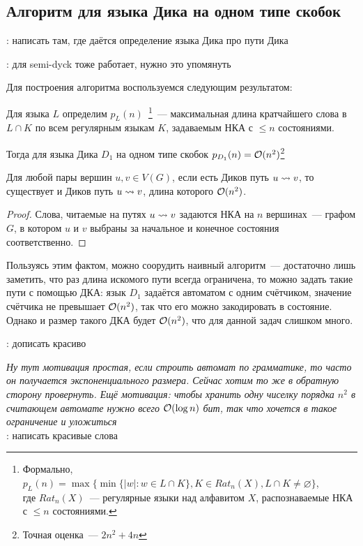\subsection{Алгоритм для языка Дика на одном типе скобок}

\TODO: написать там, где даётся определение языка Дика про пути Дика

\TODO: для semi-dyck тоже работает, нужно это упомянуть

Для построения алгоритма воспользуемся следующим результатом:

\begin{lemma}\cite{Deleage1986}

Для языка $L$ определим $p_L(n)$~\footnote{Формально, $p_L(n) = \max \{ \min \{|w| \colon w \in L \cap K \}, K \in Rat_n(X), L \cap K \ne \varnothing \}$,\\ где $Rat_n(X)$~--- регулярные языки над алфавитом $X$, распознаваемые НКА с $\le n$ состояниями.}~--- максимальная длина кратчайшего слова в $L \cap K$ по всем регулярным языкам $K$, задаваемым НКА с $\le n$ состояниями.

Тогда для языка Дика $D_1$ на одном типе скобок $p_{D_1}(n) = \mathcal{O}(n^2)$\footnote{Точная оценка~--- $2n^2 + 4n$}
\end{lemma}

\begin{corollary}
    Для любой пары вершин $u, v \in V(G)$, если есть Диков путь $u \rightsquigarrow v$, то существует и Диков путь $u \rightsquigarrow v$, длина которого $\mathcal{O}(n^2)$.
\end{corollary}
\begin{proof}
    Слова, читаемые на путях $u \rightsquigarrow v$ задаются НКА на $n$ вершинах~--- графом $G$, в котором $u$ и $v$ выбраны за начальное и конечное состояния соответственно.
\end{proof}

\begin{note}
Пользуясь этим фактом, можно соорудить наивный алгоритм~--- достаточно лишь заметить, что раз длина искомого пути всегда ограничена, то можно задать такие пути с помощью ДКА: язык $D_1$ задаётся автоматом с одним счётчиком, значение счётчика не превышает $\mathcal{O}(n^2)$, так что его можно закодировать в состояние. Однако и размер такого ДКА будет $\mathcal{O}(n^2)$, что для данной задач слишком много.
\end{note} 

\TODO: дописать красиво

\textit{Ну тут мотивация простая, если строить автомат по грамматике, то часто он получается экспоненциального размера. Сейчас хотим то же в обратную сторону провернуть. Ещё мотивация: чтобы хранить одну чиселку порядка $n^2$ в считающем автомате нужно всего $\mathcal{O}(\log n)$ бит, так что хочется в такое ограничение и уложиться}\\
\TODO: написать красивые слова

